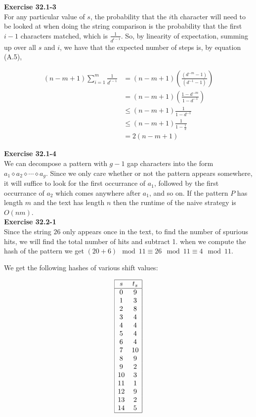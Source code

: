 \documentclass{article}
\begin{document}
\noindent\textbf{Exercise 32.1-3}\\

For any particular value of $s$, the probability that the $i$th character will need to be looked at when doing the string comparison is the probability that the first $i-1$ characters matched, which is $\frac{1}{d^{i-1}}$. So, by linearity of expectation, summing up over all $s$ and $i$, we have that the expected number of steps is, by equation (A.5),

\begin{align*}
(n-m+1) \sum_{i=1}^{m} \frac{1}{d^{i-1}}&=  (n-m+1)\left(\frac{(d^{-m}-1)}{(d^{-1}-1)}\right)\\
&= (n-m+1)(\frac{1-d^{-m}}{1-d^{-1}}) \\
&\le (n-m+1) \frac{1}{1-d^{-1}}\\
&\le (n-m+1) \frac{1}{1-\frac{1}{2}}\\
& = 2(n-m+1)
\end{align*}


\noindent\textbf{Exercise 32.1-4}\\

We can decompose a pattern with $g-1$ gap characters into the form $a_1 \diamond a_2 \diamond \cdots \diamond a_g$.  Since we only care whether or not the pattern appears somewhere, it will suffice to look for the first occurrance of $a_1$, followed by the first occurrance of $a_2$ which comes anywhere after $a_1$, and so on.  If the pattern $P$ has length $m$ and the text has length $n$ then the runtime of the naive strategy is $O(nm)$.\\

\noindent\textbf{Exercise 32.2-1}\\

Since the string $26$ only appears once in the text, to find the number of spurious hits, we will find the total number of hits and subtract 1. when we compute the hash of the pattern we get $(20 + 6)\mod 11 \equiv 26\mod 11 \equiv 4\mod 11$.

We get the following hashes of various shift values:

\[
\begin{array}{|cc|}
\hline 
s&t_s\\
\hline
0&9\\
1&3\\
2&8\\
3&4\\
4&4\\
5&4\\
6&4\\
7&10\\
8&9\\
9&2\\
10&3\\
11&1\\
12&9\\
13&2\\
14&5\\
\hline
\end{array}
\]
\end{document}
